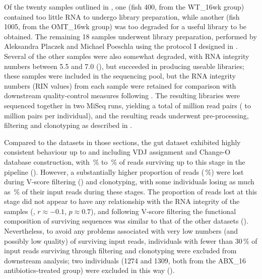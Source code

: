 Of the twenty samples outlined in , one (fish 400, from the WT\_16wk group) contained too little RNA to undergo \igseq library preparation, while another (fish 1005, from the OMT\_16wk group) was too degraded for a useful library to be obtained. The remaining 18 samples underwent \igseq library preparation, performed by Aleksandra Placzek and Michael Poeschla using the protocol I designed in . Several of the other samples were also somewhat degraded, with RNA integrity numbers between 5.5 and 7.0 (), but succeeded in producing useable libraries; these samples were included in the sequencing pool, but the RNA integrity numbers (RIN values) from each sample were retained for comparison with downstream quality-control measures following \Igseq. The resulting libraries were sequenced together in two MiSeq runs, yielding a total of  million read pairs ( to  million pairs per individual), and the resulting reads underwent pre-processing, filtering and clonotyping as described in .

Compared to the datasets in those sections, the gut dataset exhibited highly consistent behaviour up to and including VDJ assignment and Change-O database construction, with \,\% to \,\% of reads surviving up to this stage in the pipeline (). However, a substantially higher proportion of reads (\,\%) were lost during V-score filtering () and clonotyping, with some individuals losing as much as \,\% of their input reads during these stages. The proportion of reads lost at this stage did not appear to have any relationship with the RNA integrity of the samples (, $r \approx -0.1$, $p \approx 0.7$), and following V-score filtering the functional composition of surviving sequences was similar to that of the other datasets (). Nevertheless, to avoid any problems associated with very low numbers (and possibly low quality) of surviving input reads, individuals with fewer than 30\,\% of input reads surviving through filtering and clonotyping were excluded from downstream analysis; two individuals (1274 and 1309, both from the ABX\_16 antibiotics-treated group) were excluded in this way ().

